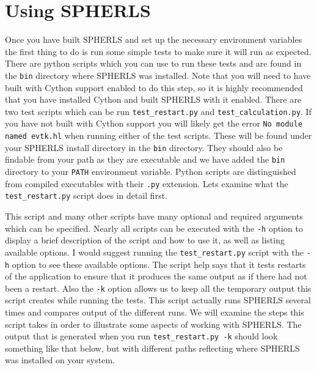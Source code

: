 \documentclass[12pt,a4paper]{book}
\begin{document}
\chapter{Using SPHERLS}
Once you have built SPHERLS and set up the necessary environment variables the first thing to do is run some simple tests to make sure it will run as expected. There are python scripts which you can use to run these tests and are found in the {\tt bin} directory where SPHERLS was installed. Note that you will need to have built with Cython support enabled to do this step, so it is highly recommended that you have installed Cython and built SPHERLS with it enabled. There are two test scripts which can be run {\tt test\_restart.py} and {\tt test\_calculation.py}. If you have not built with Cython support you will likely get the error {\tt No module named evtk.hl} when running either of the test scripts. These will be found under your SPHERLS install directory in the {\tt bin} directory. They should also be findable from your path as they are executable and we have added the {\tt bin} directory to your {\tt PATH} environment variable. Python scripts are distinguished from compiled executables with their {\tt .py} extension. Lets examine what the {\tt test\_restart.py} script does in detail first.

This script and many other scripts have many optional and required arguments which can be specified. Nearly all scripts can be executed with the {\tt -h} option to display a brief description of the script and how to use it, as well as listing available options. I would suggest running the {\tt test\_restart.py} script with the {\tt -h} option to see these available options. The script help says that it tests restarts of the application to ensure that it produces the same output as if there had not been a restart. Also the {\tt -k} option allows us to keep all the temporary output this script creates while running the tests. This script actually runs SPHERLS several times and compares output of the different runs. We will examine the steps this script takes in order to illustrate some aspects of working with SPHERLS. The output that is generated when you run {\tt test\_restart.py -k} should look something like that below, but with different paths reflecting where SPHERLS was installed on your system.
\end{document}
